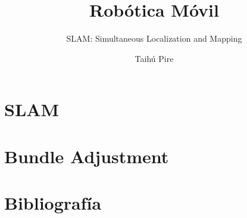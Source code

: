 \documentclass[aspectratio=169,compress]{beamer}
\subtitle{SLAM: Simultaneous Localization and Mapping}
\title{Robótica Móvil}
\author{Taihú Pire}
\institute{Laboratorio de Robótica}
\date{}
\begin{document}
	
	\frame{\titlepage}
	
	\section{SLAM}
	
    
    \section{Bundle Adjustment}
    
	
	\section{Bibliografía}
	
	
\end{document}
